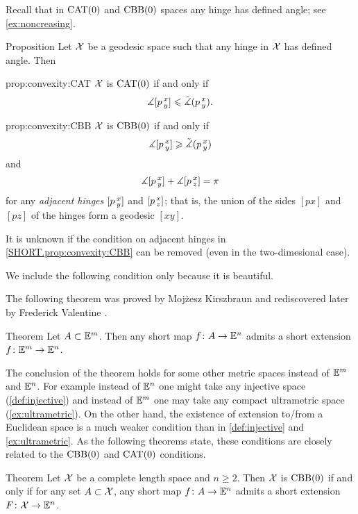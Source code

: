 Recall that in $\mathrm{CAT}(0)$ and $\mathrm{CBB}(0)$ spaces any hinge has defined angle; see \ref{ex:noncreasing}.

\begin{thm}{Proposition}\label{prop:convexity}
Let $\mathcal{X}$ be a geodesic space such that any hinge in $\mathcal{X}$ has defined angle.
Then 

\begin{subthm}{prop:convexity:CAT}
$\mathcal{X}$ is $\mathrm{CAT}(0)$ if and only if 
\[\measuredangle[p\,{}^{x}_{y}]\leqslant \tilde\measuredangle(p\,{}^{x}_{y}).\]
\end{subthm}

\begin{subthm}{prop:convexity:CBB}
$\mathcal{X}$ is $\mathrm{CBB}(0)$ if and only if 
\[\measuredangle[p\,{}^{x}_{y}]\geqslant \tilde\measuredangle(p\,{}^{x}_{y})\]
and 
\[\measuredangle[p\,{}^{x}_{y}]+\measuredangle[p\,{}^{x}_{z}]=\pi\]
for any {}\emph{adjacent hinges} $[p\,{}^{x}_{y}]$ and $[p\,{}^{x}_{z}]$;
that is, the union of the sides $[px]$ and $[pz]$ of the hinges form a geodesic $[xy]$.
\end{subthm}

\end{thm}

It is unknown if the condition on adjacent hinges in \ref{SHORT.prop:convexity:CBB} can be removed (even in the two-dimesional case).

We include the following condition only because it is beautiful.

The following theorem was proved by Mojżesz Kirszbraun \cite{kirszbraun} and rediscovered later by Frederick Valentine \cite{valentine}.

\begin{thm}{Theorem}
Let $A\subset \mathbb{E}^m$.
Then any short map $f\colon A\to \mathbb{E}^n$
admits a short extension $f\colon\mathbb{E}^m\to \mathbb{E}^n$.
\end{thm}

The conclusion of the theorem holds for some other metric spaces instead of $\mathbb{E}^m$ and $\mathbb{E}^n$.
For example instead of $\mathbb{E}^n$ one might take any injective space (\ref{def:injective}) and instead of $\mathbb{E}^m$ one may take any compact ultrametric space (\ref{ex:ultrametric}).
On the other hand, the existence of extension to/from a Euclidean space is a much weaker condition than in \ref{def:injective} and \ref{ex:ultrametric}.
As the following theorems state, these conditions are closely related to the $\mathrm{CBB}(0)$ and $\mathrm{CAT}(0)$ conditions.

\begin{thm}{Theorem}
Let $\mathcal{X}$ be a complete length space and $n\ge 2$.
Then $\mathcal{X}$ is $\mathrm{CBB}(0)$ if and only if for any set $A\subset \mathcal{X}$, 
any short map $f\colon A\to \mathbb{E}^n$ 
admits a short extension $F\colon\mathcal{X}\to \mathbb{E}^n$.
\end{thm}

